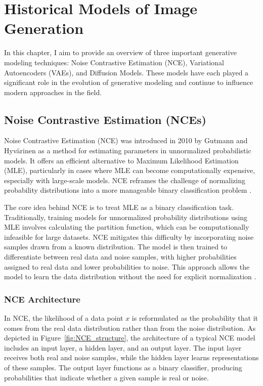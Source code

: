 \chapter{Historical Models of Image Generation}

In this chapter, I aim to provide an overview of three important generative modeling techniques: Noise Contrastive Estimation (NCE), Variational Autoencoders (VAEs), and Diffusion Models. These models have each played a significant role in the evolution of generative modeling and continue to influence modern approaches in the field. 

\section{Noise Contrastive Estimation (NCEs)}

Noise Contrastive Estimation (NCE) was introduced in 2010 by Gutmann and Hyvärinen as a method for estimating parameters in unnormalized probabilistic models. It offers an efficient alternative to Maximum Likelihood Estimation (MLE), particularly in cases where MLE can become computationally expensive, especially with large-scale models. NCE reframes the challenge of normalizing probability distributions into a more manageable binary classification problem \citep{10.48550/arxiv.1711.00658}. 

The core idea behind NCE is to treat MLE as a binary classification task. Traditionally, training models for unnormalized probability distributions using MLE involves calculating the partition function, which can be computationally infeasible for large datasets. NCE mitigates this difficulty by incorporating noise samples drawn from a known distribution. The model is then trained to differentiate between real data and noise samples, with higher probabilities assigned to real data and lower probabilities to noise. This approach allows the model to learn the data distribution without the need for explicit normalization \citep{10.48550/arxiv.2110.11271}.

\subsection{NCE Architecture}
In NCE, the likelihood of a data point \( x \) is reformulated as the probability that it comes from the real data distribution rather than from the noise distribution. As depicted in Figure~\ref{fig:NCE_structure}, the architecture of a typical NCE model includes an input layer, a hidden layer, and an output layer. The input layer receives both real and noise samples, while the hidden layer learns representations of these samples. The output layer functions as a binary classifier, producing probabilities that indicate whether a given sample is real or noise.

